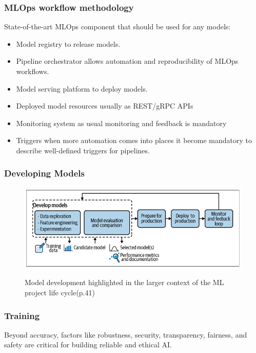 \subsubsection{MLOps workflow methodology}
State-of-the-art MLOps component that should be used for any models\cite{BURGUENOROMERO2025107499}:
\begin{itemize}
    \item Model registry to release models.
    \item Pipeline orchestrator allows automation and reproducibility of MLOps workflows.
    \item Model serving platform to deploy models.
    \item Deployed model resources usually as REST/gRPC APIs
    \item Monitoring system as usual monitoring and feedback is mandatory
    \item Triggers when more automation comes into places it become mandatory to describe well-defined triggers for pipelines.
\end{itemize}

\subsubsection{Developing Models}
\begin{figure}[!htbp]
    \caption{Model development highlighted in the larger context of the ML project life
    cycle\cite{treveil2020introducing}(p.41)}
    \centering
    \includegraphics[scale=0.5]{images/developing-models-intro}
    \label{fig:developing-models-intro}
\end{figure}

\subsubsection{Training}

Beyond accuracy, factors like robustness, security, transparency, fairness, and safety are critical for building reliable and ethical AI\cite{10.1145/3555803}.

